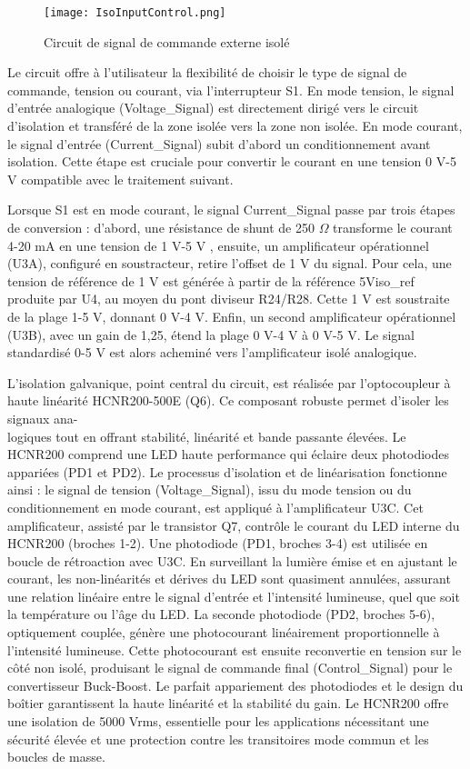 \begin{figure}[H]
\centering
\texttt{[image: IsoInputControl.png]}
\caption{Circuit de signal de commande externe isolé}
\label{fig:iso_input_control}
\end{figure}

Le circuit offre à l'utilisateur la flexibilité de choisir le type de signal de commande, tension ou courant, via l'interrupteur S1. En mode tension, le signal d'entrée analogique (Voltage\_Signal) est directement dirigé vers le circuit d'isolation et transféré de la zone isolée vers la zone non isolée. En mode courant, le signal d'entrée (Current\_Signal) subit d'abord un conditionnement avant isolation. Cette étape est cruciale pour convertir le courant en une tension 0 V-5 V compatible avec le traitement suivant.

Lorsque S1 est en mode courant, le signal Current\_Signal passe par trois étapes de conversion : d'abord, une résistance de shunt de 250 $\Omega$ transforme le courant 4-20 mA en une tension de 1 V-5 V , ensuite, un amplificateur opérationnel (U3A), configuré en soustracteur, retire l'offset de 1 V du signal. Pour cela, une tension de référence de 1 V est générée à partir de la référence 5Viso\_ref produite par U4, au moyen du pont diviseur R24/R28. Cette 1 V est soustraite de la plage 1-5 V, donnant 0 V-4 V. Enfin, un second amplificateur opérationnel (U3B), avec un gain de 1,25, étend la plage 0 V-4 V à 0 V-5 V. Le signal standardisé 0-5 V est alors acheminé vers l'amplificateur isolé analogique.

L'isolation galvanique, point central du circuit, est réalisée par l'optocoupleur à haute linéarité HCNR200-500E (Q6). Ce composant robuste permet d'isoler les signaux ana-\\logiques tout en offrant stabilité, linéarité et bande passante élevées. Le HCNR200 comprend une LED haute performance qui éclaire deux photodiodes appariées (PD1 et PD2). Le processus d'isolation et de linéarisation fonctionne ainsi : le signal de tension (Voltage\_Signal), issu du mode tension ou du conditionnement en mode courant, est appliqué à l'amplificateur U3C. Cet amplificateur, assisté par le transistor Q7, contrôle le courant du LED interne du HCNR200 (broches 1-2). Une photodiode (PD1, broches 3-4) est utilisée en boucle de rétroaction avec U3C. En surveillant la lumière émise et en ajustant le courant, les non-linéarités et dérives du LED sont quasiment annulées, assurant une relation linéaire entre le signal d'entrée et l'intensité lumineuse, quel que soit la température ou l'âge du LED. La seconde photodiode (PD2, broches 5-6), optiquement couplée, génère une photocourant linéairement proportionnelle à l'intensité lumineuse. Cette photocourant est ensuite reconvertie en tension sur le côté non isolé, produisant le signal de commande final (Control\_Signal) pour le convertisseur Buck-Boost. Le parfait appariement des photodiodes et le design du boîtier garantissent la haute linéarité et la stabilité du gain. Le HCNR200 offre une isolation de 5000 Vrms, essentielle pour les applications nécessitant une sécurité élevée et une protection contre les transitoires mode commun et les boucles de masse.






